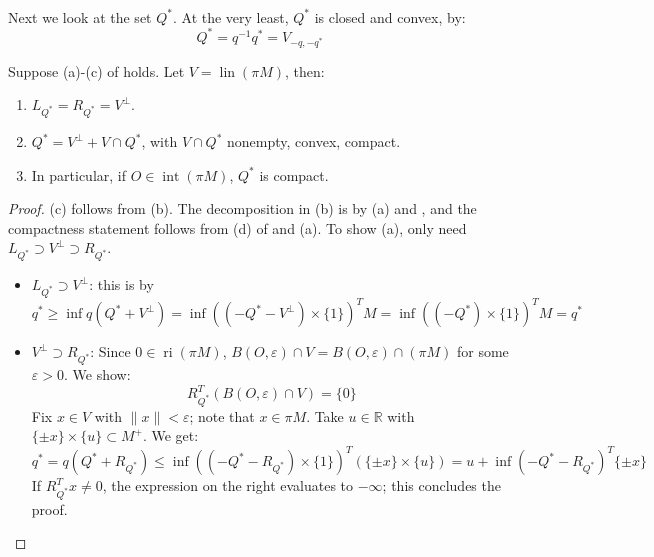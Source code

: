 \paragraph{}Next we look at the set $Q^\ast$. At the very least, $Q^\ast$ is closed and convex, by:
\[
	Q^\ast = q^{-1}q^\ast = V_{-q,-q^\ast}
\]

\begin{prop}\label{prop:032-optimal-set}
	Suppose (a)-(c) of  holds. Let $V=\operatorname{lin}(\pi M)$, then:
	\begin{enumerate}[label=(\alph*)]
		\item $L_{Q^\ast}=R_{Q^\ast}=V^\perp$.
		\item $Q^\ast = V^\perp + V\cap Q^\ast$, with $V\cap Q^\ast$ nonempty, convex, compact.
		\item In particular, if $O\in \operatorname{int}(\pi M)$, $Q^\ast$ is compact.
	\end{enumerate}
\end{prop}

\begin{proof}
	(c) follows from (b). The decomposition in (b) is by (a) and , and the compactness statement follows from (d) of  and (a). To show (a), only need $L_{Q^\ast}\supset V^\perp \supset R_{Q^\ast}$.
	\begin{itemize}
		\item $L_{Q^\ast}\supset V^\perp$: this is by
		      \[
			      q^\ast \geq \inf q(Q^\ast + V^\perp )=\inf \left((-Q^\ast - V^\perp)\times \{1\}\right)^T M = \inf \left((-Q^\ast) \times \{1\}\right)^TM = q^\ast
		      \]
		\item $V^\perp\supset R_{Q^\ast}$: Since $0\in \operatorname{ri}(\pi M)$, $B({O,\varepsilon})\cap V = B({O,\varepsilon})\cap (\pi M)$ for some $\varepsilon >0$. We show:
		      \[
			      R_{Q^\ast}^T \left(B({O,\varepsilon})\cap V\right) = \{0\}
		      \]
		      Fix $x\in V$ with $\|x\|<\varepsilon $; note that $x\in \pi M$. Take $u\in \mathbb{R}$ with $\{\pm x\}\times \{u\}\subset M^+$. We get:
		      \[
			      q^\ast = q(Q^\ast + R_{Q^\ast})\leq \inf \left(\left(-Q^\ast-R_{Q^\ast}\right)\times \{1\}\right)^T\left(\{\pm x\}\times \{u\}\right)
			      =u+\inf \left(-Q^\ast-R_{Q^\ast}\right)^T\{\pm x\}
		      \]
		      If $R_{Q^\ast}^Tx\neq0$, the expression on the right evaluates to $-\infty$; this concludes the proof. \qedhere
	\end{itemize}
\end{proof}

